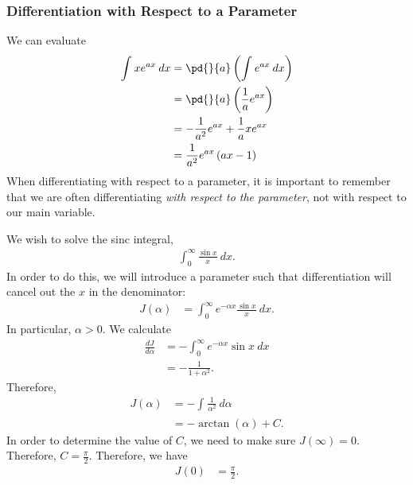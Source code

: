 \documentclass[10pt]{mypackage}
\begin{document}
\subsubsection{Differentiation with Respect to a Parameter}%
\begin{example}
  We can evaluate
  \begin{align*}
    \int_{}^{} xe^{ax}\:dx &= \pd{}{a}\left(\int_{}^{} e^{ax}\:dx\right)\\
                           &= \pd{}{a} \left(\frac{1}{a}e^{ax}\right)\\
                           &= -\frac{1}{a^2}e^{ax} + \frac{1}{a}xe^{ax}\\
                           &= \frac{1}{a^2}e^{ax}\left(ax - 1\right)
  \end{align*}
  When differentiating with respect to a parameter, it is important to remember that we are often differentiating \textit{with respect to the parameter}, not with respect to our main variable.
\end{example}
\begin{example}
  We wish to solve the sinc integral,
  \begin{align*}
    \int_{0}^{\infty} \frac{\sin x}{x}\:dx.
  \end{align*}
  In order to do this, we will introduce a parameter such that differentiation will cancel out the $x$ in the denominator:
  \begin{align*}
    J\left(\alpha\right) &= \int_{0}^{\infty} e^{-\alpha x}\frac{\sin x}{x}\:dx. \tag*{$\alpha > 0$}
  \end{align*}
  In particular, $\alpha > 0$. We calculate
  \begin{align*}
    \frac{dJ}{d\alpha} &= -\int_{0}^{\infty} e^{-\alpha x}\sin x\:dx\\
                       &= -\frac{1}{1 + \alpha^2}.
  \end{align*}
  Therefore,
  \begin{align*}
    J\left(\alpha\right) &= -\int_{}^{} \frac{1}{\alpha^2}\:d\alpha\\
                         &= -\arctan\left(\alpha\right) + C.
  \end{align*}
  In order to determine the value of $C$, we need to make sure $J(\infty) = 0$. Therefore, $C = \frac{\pi}{2}$. Therefore, we have
  \begin{align*}
    J(0) &= \frac{\pi}{2}.
  \end{align*}
\end{example}
\end{document}
